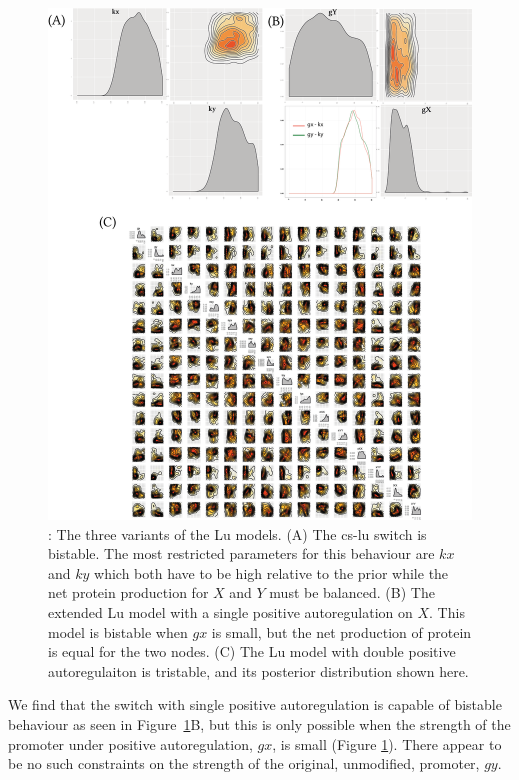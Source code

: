 \begin{figure}[p]
\centerfloat
\includegraphics[scale=0.9]{../../chapters/chapterStabilityFinder/images/lu_paper_post.png}
\caption[Posterior distributions of the Lu switches]{ \label{fig:fig3}: The three variants of the Lu models. (A) The \acrshort{cs-lu} switch is bistable. The most restricted parameters for this behaviour are $kx$ and $ky$ which both have to be high relative to the prior while the net protein production for $X$ and $Y$ must be balanced. (B) The extended Lu model with a single positive autoregulation on $X$. This model is bistable when $gx$ is small, but the net production of protein is equal for the two nodes. (C) The Lu model with double positive autoregulaiton is tristable, and its posterior distribution shown here. }

\end{figure}
\clearpage

We find that the switch with single positive autoregulation is capable of bistable behaviour as seen in Figure~\ref{fig:fig3}B, but this is only possible when the strength of the promoter under positive autoregulation, $gx$, is small (Figure \ref{fig:fig3}). There appear to be no such constraints on the strength of the original, unmodified, promoter, $gy$.  

